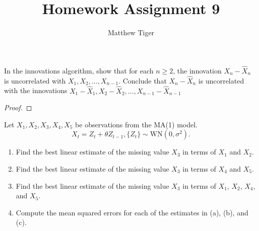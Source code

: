 \documentclass[12pt]{article}
\title{Homework Assignment 9}
\author{Matthew Tiger}
\theoremstyle{definition}
\newenvironment{custompbm}[1]
  {\renewcommand\theproblem{#1}\problem}
  {\endproblem}
\begin{document}
\maketitle


\begin{custompbm}{2.20}
  In the innovations algorithm, show that for each $n\geq 2$, the innovation
  $X_n - \hat{X}_n$ is uncorrelated with $X_1, X_2, \dots, X_{n-1}$. Conclude that
  $X_n - \hat{X}_n$ is uncorrelated with the innovations
  $X_1 - \hat{X}_1, X_2 - \hat{X}_2, \dots, X_{n-1} - \hat{X}_{n-1}$
\end{custompbm}

\begin{proof}
\end{proof}


\begin{custompbm}{2.21}
  Let $X_1, X_2, X_3, X_4, X_5$ be observations from the MA(1) model.
  \[
    X_t = Z_t + \theta Z_{t-1}, \{Z_t\} \sim \text{WN}(0, \sigma^2).
  \]
  \begin{enumerate}
    \item Find the best linear estimate of the missing value $X_3$ in terms of
      $X_1$ and $X_2$.
    \item Find the best linear estimate of the missing value $X_3$ in terms of
      $X_4$ and $X_5$.
    \item Find the best linear estimate of the missing value $X_3$ in terms of
      $X_1$, $X_2$, $X_4$, and $X_5$.
    \item Compute the mean squared errors for each of the estimates in (a),
      (b), and (c).
  \end{enumerate}
\end{custompbm}
\end{document}
